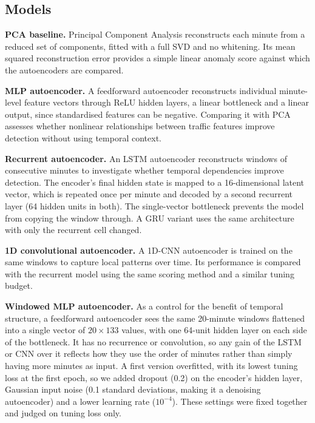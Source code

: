 \documentclass[conference]{IEEEtran}
\begin{document}
\subsection{Models}
\textbf{PCA baseline.} Principal Component Analysis reconstructs each minute from a reduced set of components, fitted with a full SVD and no whitening. Its mean squared reconstruction error provides a simple linear anomaly score against which the autoencoders are compared.

\textbf{MLP autoencoder.} A feedforward autoencoder reconstructs individual minute-level feature vectors through ReLU hidden layers, a linear bottleneck and a linear output, since standardised features can be negative. Comparing it with PCA assesses whether nonlinear relationships between traffic features improve detection without using temporal context.

\textbf{Recurrent autoencoder.} An LSTM autoencoder reconstructs windows of consecutive minutes to investigate whether temporal dependencies improve detection. The encoder's final hidden state is mapped to a 16-dimensional latent vector, which is repeated once per minute and decoded by a second recurrent layer (64 hidden units in both). The single-vector bottleneck prevents the model from copying the window through. A GRU variant uses the same architecture with only the recurrent cell changed.

\textbf{1D convolutional autoencoder.} A 1D-CNN autoencoder is trained on the same windows to capture local patterns over time. Its performance is compared with the recurrent model using the same scoring method and a similar tuning budget.

\textbf{Windowed MLP autoencoder.} As a control for the benefit of temporal structure, a feedforward autoencoder sees the same 20-minute windows flattened into a single vector of $20 \times 133$ values, with one 64-unit hidden layer on each side of the bottleneck. It has no recurrence or convolution, so any gain of the LSTM or CNN over it reflects how they use the order of minutes rather than simply having more minutes as input. A first version overfitted, with its lowest tuning loss at the first epoch, so we added dropout (0.2) on the encoder's hidden layer, Gaussian input noise (0.1 standard deviations, making it a denoising autoencoder) and a lower learning rate ($10^{-4}$). These settings were fixed together and judged on tuning loss only.
\end{document}
